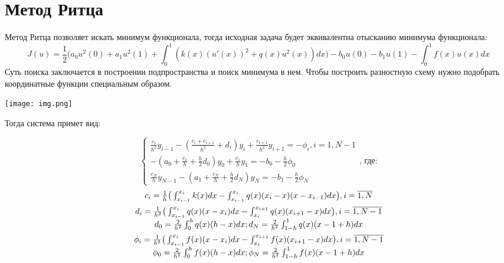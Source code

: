 \documentclass[a4paper]{article}
\begin{document}
	\newpage
	
	\section{Метод Ритца}
	
	Метод Ритца позволяет искать минимум функционала, тогда исходная задача будет эквивалентна отысканию минимума функционала:
	$$
		J(u) = \frac{1}{2} \Big(a_0 u^2(0) + a_1 u^2(1) +
		\int_{0}^{1} (k(x) (u'(x))^2 + q(x) u^2(x))dx\Big) -
		b_0 u(0) - b_1 u(1) - \int_{0}^{1} f(x)u(x)dx
	$$
	Суть поиска заключается в построении подпространства и поиск минимума в нем. Чтобы построить разностную схему нужно подобрать координатные функции специальным образом.
	
	\begin{center}
		\texttt{[image: img.png]}
	\end{center}

	Тогда система примет вид:
	\begin{large} 
	$$
	\begin{cases}
		\frac{c_i}{h^2} y_{i-1} - (\frac{c_i + c_{i + 1}}{h^2} + d_i) y_i + \frac{c_{i+1}}{h^2} y_{i+1} = -\phi_i, i = \overline{1, N - 1} \\
		-(a_0 + \frac{c_1}{h} + \frac{h}{2} d_0) y_0 +
		\frac{c_1}{h} y_1 = -b_0 - \frac{h}{2} \phi_0 \\
		\frac{c_N}{h} y_{N - 1} -
		(a_1 + \frac{c_N}{h} + \frac{h}{2} d_N) y_N  =
		-b_1 - \frac{h}{2} \phi_N
	\end{cases}\text{, где:}
	$$ 
	$$ 
	\begin{matrix}
		\vspace{0.5em}
		c_i = \frac{1}{h} \big( \int_{x_{i-1}}^{x_i} k(x) dx - \int_{x_{i-1}}^{x_i} q(x) (x_i - x)(x - x_{i-1}) dx \big), i = \overline{1, N} \\ 
		d_i = \frac{1}{h^2} \big( \int_{x_{i-1}}^{x_i} q(x)(x - x_i) dx - \int_{x_i}^{x_{i + 1}} q(x) (x_{i+1} - x) dx \big), i = \overline{1, N-1} \\
		\vspace{0.5em}
		d_0 = \frac{2}{h^2} \int_{0}^{h} q(x)(h - x) dx;
		d_N = \frac{2}{h^2} \int_{1-h}^{1} q(x)(x - 1 + h) dx \\
		\phi_i = \frac{1}{h^2} \big( \int_{x_{i-1}}^{x_i} f(x)(x - x_i) dx - \int_{x_i}^{x_{i + 1}} f(x) (x_{i+1} - x) dx \big), i = \overline{1, N-1} \\
		\phi_0 = \frac{2}{h^2} \int_{0}^{h} f(x)(h - x) dx;
		\phi_N = \frac{2}{h^2} \int_{1-h}^{1} f(x)(x - 1 + h) dx \\
	\end{matrix}
	$$
	\end{large}
\end{document}
